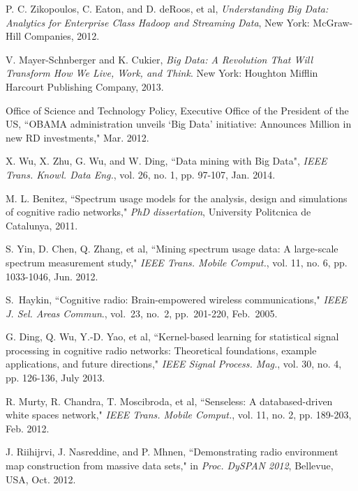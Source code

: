 \documentclass[12pt,draftcls,journal,letterpaper,oneside,onecolumn]{IEEEtran}
\begin{document}
\begin{thebibliography}{99}

P. C. Zikopoulos, C. Eaton, and D. deRoos, et al, \emph{Understanding Big Data: Analytics for Enterprise Class Hadoop and Streaming Data}, New York: McGraw-Hill Companies, 2012.

V. Mayer-Schnberger and K. Cukier, \emph{Big Data: A Revolution That Will Transform How We Live, Work, and Think}. New York: Houghton Mifflin Harcourt Publishing Company, 2013.

Office of Science and Technology Policy, Executive Office of the President of the US, ``OBAMA administration unveils `Big Data' initiative: Announces  Million in new RD investments," Mar. 2012.


X. Wu, X. Zhu, G. Wu, and W. Ding, ``Data mining with Big Data", \emph{IEEE Trans. Knowl. Data Eng.}, vol. 26, no. 1, pp. 97-107, Jan. 2014.



M. L. Benitez, ``Spectrum usage models for the analysis, design and simulations of cognitive radio networks," \emph{PhD dissertation}, University Politcnica de Catalunya, 2011.

S. Yin, D. Chen, Q. Zhang, et al, ``Mining spectrum usage data: A large-scale spectrum measurement study," \emph{IEEE Trans. Mobile Comput.}, vol. 11, no. 6, pp. 1033-1046, Jun. 2012.

S.~Haykin, ``Cognitive radio: Brain-empowered wireless communications," \emph{IEEE J. Sel. Areas Commun}., vol.~23, no.~2, pp.~201-220, Feb.~2005.

G. Ding, Q. Wu, Y.-D. Yao, et al, ``Kernel-based learning for statistical signal processing in cognitive radio networks: Theoretical foundations, example applications, and future directions," \emph{IEEE Signal Process. Mag.}, vol. 30, no. 4, pp. 126-136, July 2013.


R. Murty, R. Chandra, T. Moscibroda, et al, ``Senseless: A databased-driven white spaces network," \emph{IEEE Trans. Mobile Comput.}, vol. 11, no. 2, pp. 189-203, Feb. 2012.

J. Riihijrvi, J. Nasreddine, and P. Mhnen, ``Demonstrating radio environment map construction from massive data sets," in \emph{Proc. DySPAN 2012}, Bellevue, USA, Oct. 2012.


\end{thebibliography}
\end{document}
